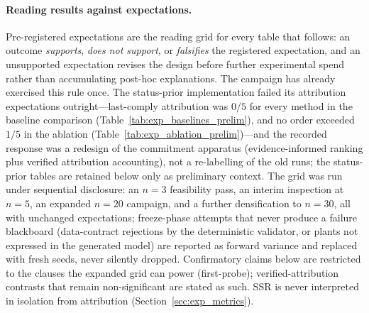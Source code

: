 \documentclass[a4paper,fleqn]{cas-sc}
\begin{document}
\paragraph{Reading results against expectations.}
Pre-registered expectations are the reading grid for every table that
follows: an outcome \emph{supports}, \emph{does not support}, or
\emph{falsifies} the registered expectation, and an unsupported
expectation revises the design before further experimental spend rather
than accumulating post-hoc explanations. The campaign has already exercised
this rule once. The status-prior implementation failed its attribution
expectations outright---last-comply attribution was $0/5$ for every method
in the baseline comparison (Table~\ref{tab:exp_baselines_prelim}), and no
order exceeded $1/5$ in the ablation
(Table~\ref{tab:exp_ablation_prelim})---and the recorded response was a
redesign of the commitment apparatus (evidence-informed ranking plus
verified attribution accounting), not a re-labelling of the old runs; the
status-prior tables are retained below only as preliminary context. The
grid was run under sequential disclosure: an $n{=}3$ feasibility pass, an
interim inspection at $n{=}5$, an expanded $n{=}20$ campaign, and a further
densification to $n{=}30$, all with unchanged expectations; freeze-phase
attempts that never produce a failure
blackboard (data-contract rejections by the deterministic validator, or
plants not expressed in the generated model) are reported as forward
variance and replaced with fresh seeds, never silently dropped.
Confirmatory claims below are restricted to the clauses the expanded grid
can power (first-probe); verified-attribution contrasts that remain
non-significant are stated as such. SSR is never interpreted in isolation
from attribution (Section~\ref{sec:exp_metrics}).
\end{document}
